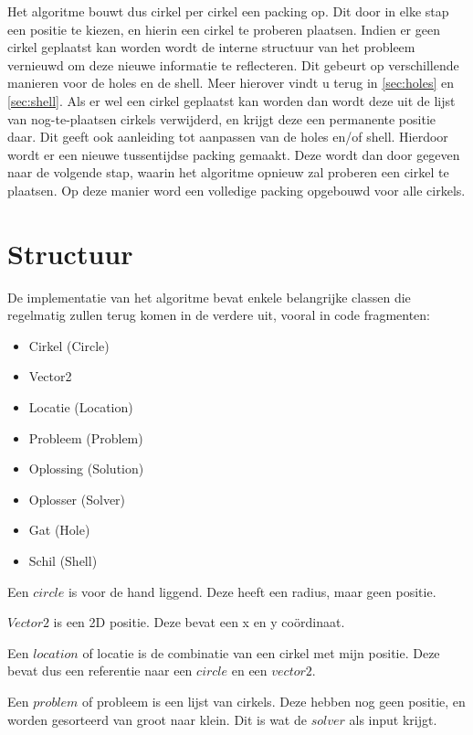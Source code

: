 \documentclass[12pt,a4paper,oneside]{book}
\begin{document}
Het algoritme bouwt dus cirkel per cirkel een packing op.
Dit door in elke stap een positie te kiezen, en hierin een cirkel te proberen plaatsen.
Indien er geen cirkel geplaatst kan worden wordt de interne structuur van het probleem vernieuwd om deze nieuwe informatie te reflecteren.
Dit gebeurt op verschillende manieren voor de holes en de shell.
Meer hierover vindt u terug in \autoref{sec:holes} en \autoref{sec:shell}.
Als er wel een cirkel geplaatst kan worden dan wordt deze uit de lijst van nog-te-plaatsen cirkels verwijderd, en krijgt deze een permanente positie daar.
Dit geeft ook aanleiding tot aanpassen van de holes en/of shell.
Hierdoor wordt er een nieuwe tussentijdse packing gemaakt.
Deze wordt dan door gegeven naar de volgende stap, waarin het algoritme opnieuw zal proberen een cirkel te plaatsen.
Op deze manier word een volledige packing opgebouwd voor alle cirkels.

\section{Structuur}

De implementatie van het algoritme bevat enkele belangrijke classen die regelmatig zullen terug komen in de verdere uit, vooral in code fragmenten:

\begin{itemize} 
\item Cirkel (Circle)
\item Vector2
\item Locatie (Location)
\item Probleem (Problem)
\item Oplossing (Solution)
\item Oplosser (Solver)
\item Gat (Hole)
\item Schil (Shell)
\end{itemize}

Een $circle$ is voor de hand liggend. Deze heeft een radius, maar geen positie.

$Vector2$ is een 2D positie. Deze bevat een x en y coördinaat.

Een $location$ of locatie is de combinatie van een cirkel met mijn positie. Deze bevat dus een referentie naar een $circle$ en een $vector2$.

Een $problem$ of probleem is een lijst van cirkels.
Deze hebben nog geen positie, en worden gesorteerd van groot naar klein.
Dit is wat de $solver$ als input krijgt.
\end{document}
